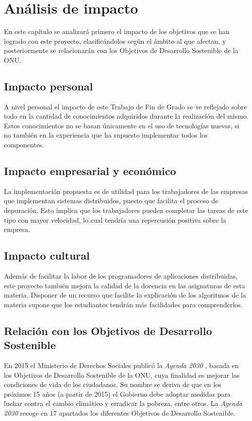 \chapter{Análisis de impacto}

En este capítulo se analizará primero el impacto de los objetivos que se han logrado con este proyecto, clasificándolos según el ámbito al que afectan, y posteriormente se relacionarán con los Objetivos de Desarrollo Sostenible de la ONU.

\section{Impacto personal}

A nivel personal el impacto de este Trabajo de Fin de Grado se ve reflejado sobre todo en la cantidad de conocimientos adquiridos durante la realización del mismo. Estos conocimientos no se basan únicamente en el uso de tecnologías nuevas, si no también en la experiencia que ha supuesto implementar todos los componentes.

\section{Impacto empresarial y económico}

La implementación propuesta es de utilidad para los trabajadores de las empresas que implementan sistemas distribuidos, puesto que facilita el proceso de depuración. Esto implica que los trabajadores pueden completar las tareas de este tipo con mayor velocidad, lo cual tendría una repercusión positiva sobre la empresa.

\section{Impacto cultural}
Además de facilitar la labor de los programadores de aplicaciones distribuidas, este proyecto también mejora la calidad de la docencia en las asignaturas de esta materia. Disponer de un recurso que facilite la explicación de los algoritmos de la materia supone que los estudiantes tendrán más facilidades para comprenderlos.

\section{Relación con los Objetivos de Desarrollo Sostenible}

En 2015 el Ministerio de Derechos Sociales publicó la \textit{Agenda 2030} \cite{agenda2030}, basada en los Objetivos de Desarrollo Sostenible \cite{ods} de la ONU, cuya finalidad es mejorar las condiciones de vida de los ciudadanos. Su nombre se deriva de que en los próximos 15 años (a partir de 2015) el Gobierno debe adoptar medidas para luchar contra el cambio climático y erradicar la pobreza, entre otros. La \textit{Agenda 2030} recoge en 17 apartados los diferentes Objetivos de Desarrollo Sostenible. 

